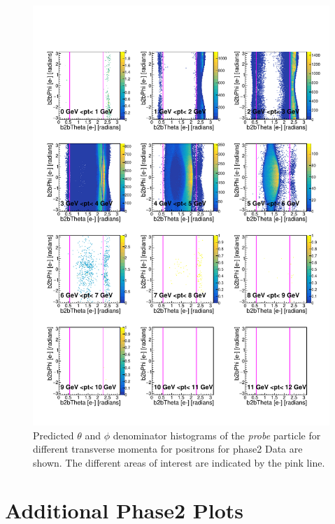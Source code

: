 \documentclass[a4paper,11pt,twosided,final,german,openbib,pdftex,listof=totoc,bibliography=totoc]{scrbook}
\begin{document}
\begin{appendix}
\begin{figure}[h!]
	\includegraphics[width=\textwidth]{Plots/RTPtMepD_Data.pdf}
	\caption[Denominator $\theta$-$\phi$ Positron Transverse Momentum Phase2 Data]{Predicted $\theta$ and $\phi$ denominator histograms of the \textit{probe} particle for different transverse momenta for positrons for phase2 Data are shown. The different areas of interest are indicated by the pink line.}
	\label{plt:RTtPMepD_Data}
\end{figure}



\chapter{Additional Phase2 Plots}










\end{appendix}
\end{document}
